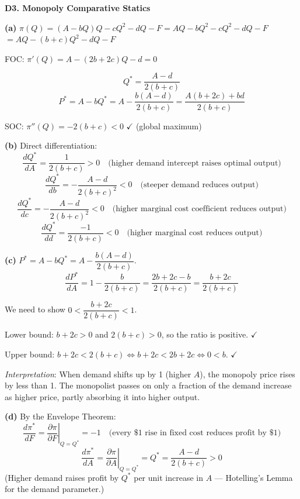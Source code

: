 \documentclass[12pt, a4paper]{article}
\theoremstyle{definition}
\newcommand{\ddd}[2]{\dfrac{d#1}{d#2}}
\newcommand{\pp}[2]{\dfrac{\partial #1}{\partial #2}}
\newcommand{\eval}[2]{\left.#1\right|_{#2}}
\begin{document}
\begin{solbox}
\textbf{D3. Monopoly Comparative Statics}

\textbf{(a)} $\pi(Q) = (A-bQ)Q - cQ^2 - dQ - F = AQ - bQ^2 - cQ^2 - dQ - F$
$= AQ-(b+c)Q^2-dQ-F$

FOC: $\pi'(Q) = A-(2b+2c)Q-d = 0$

\[
  Q^* = \frac{A-d}{2(b+c)}
\]
\[
  P^* = A - bQ^* = A - \frac{b(A-d)}{2(b+c)} = \frac{A(b+2c)+bd}{2(b+c)}
\]

SOC: $\pi''(Q) = -2(b+c) < 0$ $\checkmark$ (global maximum)

\textbf{(b)} Direct differentiation:
\[
  \ddd{Q^*}{A} = \frac{1}{2(b+c)} > 0
  \quad\text{(higher demand intercept raises optimal output)}
\]
\[
  \ddd{Q^*}{b} = -\frac{A-d}{2(b+c)^2} < 0
  \quad\text{(steeper demand reduces output)}
\]
\[
  \ddd{Q^*}{c} = -\frac{A-d}{2(b+c)^2} < 0
  \quad\text{(higher marginal cost coefficient reduces output)}
\]
\[
  \ddd{Q^*}{d} = \frac{-1}{2(b+c)} < 0
  \quad\text{(higher marginal cost reduces output)}
\]

\textbf{(c)} $P^* = A - bQ^* = A - \dfrac{b(A-d)}{2(b+c)}$.
\[
  \ddd{P^*}{A} = 1 - \frac{b}{2(b+c)} = \frac{2b+2c-b}{2(b+c)} = \frac{b+2c}{2(b+c)}
\]

We need to show $0 < \dfrac{b+2c}{2(b+c)} < 1$.

Lower bound: $b+2c > 0$ and $2(b+c)>0$, so the ratio is positive. $\checkmark$

Upper bound: $b+2c < 2(b+c) \iff b+2c < 2b+2c \iff 0 < b$. $\checkmark$

\emph{Interpretation}: When demand shifts up by 1 (higher $A$), the monopoly price rises by less than 1. The monopolist passes on only a fraction of the demand increase as higher price, partly absorbing it into higher output.

\textbf{(d)} By the Envelope Theorem:
\[
  \ddd{\pi^*}{F} = \eval{\pp{\pi}{F}}{Q=Q^*} = -1
  \quad\text{(every \$1 rise in fixed cost reduces profit by \$1)}
\]
\[
  \ddd{\pi^*}{A} = \eval{\pp{\pi}{A}}{Q=Q^*} = Q^* = \frac{A-d}{2(b+c)} > 0
\]
(Higher demand raises profit by $Q^*$ per unit increase in $A$ --- Hotelling's Lemma for the demand parameter.)
\end{solbox}
\end{document}
